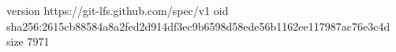version https://git-lfs.github.com/spec/v1
oid sha256:2615cb88584a8a2fed2d914df3ec9b6598d58ede56b1162ee117987ac76e3c4d
size 7971
